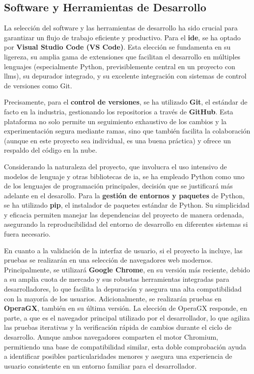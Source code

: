 \subsection{Software y Herramientas de Desarrollo}
\label{subsec:software_herramientas}

La selección del software y las herramientas de desarrollo ha sido crucial para garantizar un flujo de trabajo eficiente y productivo. Para el \textbf{\gls{ide}}, se ha optado por \textbf{Visual Studio Code (VS Code)}. Esta elección se fundamenta en su ligereza, su amplia gama de extensiones que facilitan el desarrollo en múltiples lenguajes (especialmente Python, previsiblemente central en un proyecto con \glspl{llm}), su depurador integrado, y su excelente integración con sistemas de control de versiones como Git.

Precisamente, para el \textbf{control de versiones}, se ha utilizado \textbf{Git}, el estándar de facto en la industria, gestionando los repositorios a través de \textbf{GitHub}. Esta plataforma no solo permite un seguimiento exhaustivo de los cambios y la experimentación segura mediante ramas, sino que también facilita la colaboración (aunque en este proyecto sea individual, es una buena práctica) y ofrece un respaldo del código en la nube.

Considerando la naturaleza del proyecto, que involucra el uso intensivo de modelos de lenguaje y otras bibliotecas de \gls{ia}, se ha empleado Python como uno de los lenguajes de programación principales, decisión que se justificará más adelante en el desarollo. Para la \textbf{gestión de entornos y paquetes} de Python, se ha utilizado \textbf{pip}, el instalador de paquetes estándar de Python. Su simplicidad y eficacia permiten manejar las dependencias del proyecto de manera ordenada, asegurando la reproducibilidad del entorno de desarrollo en diferentes sistemas si fuera necesario.

En cuanto a la validación de la interfaz de usuario, si el proyecto la incluye, las pruebas se realizarán en una selección de navegadores web modernos. Principalmente, se utilizará \textbf{Google Chrome}, en su versión más reciente, debido a su amplia cuota de mercado y sus robustas herramientas integradas para desarrolladores, lo que facilita la depuración y asegura una alta compatibilidad con la mayoría de los usuarios. Adicionalmente, se realizarán pruebas en \textbf{OperaGX}, también en su última versión. La elección de OperaGX responde, en parte, a que es el navegador principal utilizado por el desarrollador, lo que agiliza las pruebas iterativas y la verificación rápida de cambios durante el ciclo de desarrollo. Aunque ambos navegadores comparten el motor Chromium, permitiendo una base de compatibilidad similar, esta doble comprobación ayuda a identificar posibles particularidades menores y asegura una experiencia de usuario consistente en un entorno familiar para el desarrollador.

